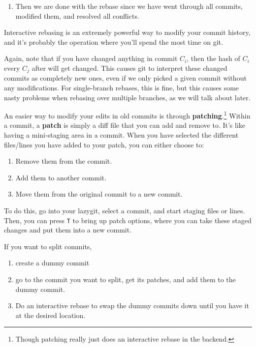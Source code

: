 \begin{definition}[Rebasing]
\begin{enumerate}
      \item Then we are done with the rebase since we have went through all commits, modified them, and resolved all conflicts. 
    \end{enumerate}
    Interactive rebasing is an extremely powerful way to modify your commit history, and it's probably the operation where you'll spend the most time on git. 
  \end{definition} 

  Again, note that if you have changed anything in commit $C_i$, then the hash of $C_i$ every $C_j$ after will get changed. This causes git to interpret these changed commits as completely new ones, even if we only picked a given commit without any modifications. For single-branch rebases, this is fine, but this causes some nasty problems when rebasing over multiple branches, as we will talk about later. 

  \begin{definition}[Patching]
    An easier way to modify your edits in old commits is through \textbf{patching}.\footnote{Though patching really just does an interactive rebase in the backend.} Within a commit, a \textbf{patch} is simply a diff file that you can add and remove to. It's like having a mini-staging area in a commit. When you have selected the different files/lines you have added to your patch, you can either choose to: 
    \begin{enumerate}
      \item Remove them from the commit. 
      \item Add them to another commit. 
      \item Move them from the original commit to a new commit. 
    \end{enumerate} 
    To do this, go into your lazygit, select a commit, and start staging files or lines. Then, you can press \texttt{T} to bring up patch options, where you can take these staged changes and put them into a new commit. 
  \end{definition}

  \begin{theorem}
    If you want to split commits, 
    \begin{enumerate}
      \item create a dummy commit 
      \item go to the commit you want to split, get its patches, and add them to the dummy commit. 
      \item Do an interactive rebase to swap the dummy commits down until you have it at the desired location. 
    \end{enumerate}
  \end{theorem} 

